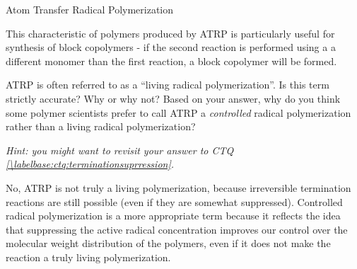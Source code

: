 \begin{activity}{Atom Transfer Radical Polymerization}
\begin{ctqs}
\begin{enumerate}
\begin{solution}[2in]{}
					This characteristic of polymers produced by ATRP is particularly useful for synthesis of block copolymers - if the second reaction is performed using a a different monomer than the first reaction, a block copolymer will be formed.
				
				\end{solution}
				
		\end{enumerate}
		
		
		
		
\end{ctqs}


\begin{exercises}

	\exercise ATRP is often referred to as a ``living radical polymerization''.  Is this term strictly accurate?  Why or why not?  Based on your answer, why do you think some polymer scientists prefer to call ATRP a \emph{controlled} radical polymerization rather than a living radical polymerization?
	
		\emph{Hint: you might want to revisit your answer to CTQ \ref{\labelbase:ctq:terminationsuprression}.}
		
		\begin{solution}{}
			No, ATRP is not truly a living polymerization, because irreversible termination reactions are still possible (even if they are somewhat suppressed).  Controlled radical polymerization is a more appropriate term because it reflects the idea that suppressing the active radical concentration improves our control over the molecular weight distribution of the polymers, even if it does not make the reaction a truly living polymerization.
		\end{solution}		
		
	\exercise 
	
		\begin{enumerate}
	

\end{enumerate}
\end{exercises}
\end{activity}
